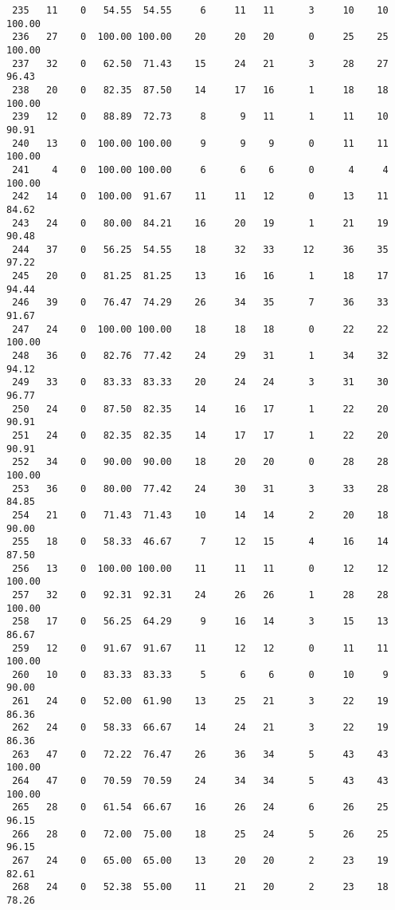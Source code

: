 \begin{verbatim}
 235   11    0   54.55  54.55     6     11   11      3     10    10   100.00
 236   27    0  100.00 100.00    20     20   20      0     25    25   100.00
 237   32    0   62.50  71.43    15     24   21      3     28    27    96.43
 238   20    0   82.35  87.50    14     17   16      1     18    18   100.00
 239   12    0   88.89  72.73     8      9   11      1     11    10    90.91
 240   13    0  100.00 100.00     9      9    9      0     11    11   100.00
 241    4    0  100.00 100.00     6      6    6      0      4     4   100.00
 242   14    0  100.00  91.67    11     11   12      0     13    11    84.62
 243   24    0   80.00  84.21    16     20   19      1     21    19    90.48
 244   37    0   56.25  54.55    18     32   33     12     36    35    97.22
 245   20    0   81.25  81.25    13     16   16      1     18    17    94.44
 246   39    0   76.47  74.29    26     34   35      7     36    33    91.67
 247   24    0  100.00 100.00    18     18   18      0     22    22   100.00
 248   36    0   82.76  77.42    24     29   31      1     34    32    94.12
 249   33    0   83.33  83.33    20     24   24      3     31    30    96.77
 250   24    0   87.50  82.35    14     16   17      1     22    20    90.91
 251   24    0   82.35  82.35    14     17   17      1     22    20    90.91
 252   34    0   90.00  90.00    18     20   20      0     28    28   100.00
 253   36    0   80.00  77.42    24     30   31      3     33    28    84.85
 254   21    0   71.43  71.43    10     14   14      2     20    18    90.00
 255   18    0   58.33  46.67     7     12   15      4     16    14    87.50
 256   13    0  100.00 100.00    11     11   11      0     12    12   100.00
 257   32    0   92.31  92.31    24     26   26      1     28    28   100.00
 258   17    0   56.25  64.29     9     16   14      3     15    13    86.67
 259   12    0   91.67  91.67    11     12   12      0     11    11   100.00
 260   10    0   83.33  83.33     5      6    6      0     10     9    90.00
 261   24    0   52.00  61.90    13     25   21      3     22    19    86.36
 262   24    0   58.33  66.67    14     24   21      3     22    19    86.36
 263   47    0   72.22  76.47    26     36   34      5     43    43   100.00
 264   47    0   70.59  70.59    24     34   34      5     43    43   100.00
 265   28    0   61.54  66.67    16     26   24      6     26    25    96.15
 266   28    0   72.00  75.00    18     25   24      5     26    25    96.15
 267   24    0   65.00  65.00    13     20   20      2     23    19    82.61
 268   24    0   52.38  55.00    11     21   20      2     23    18    78.26

\end{verbatim}
